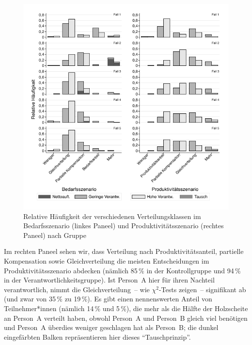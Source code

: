 \documentclass[justified,nobib,nohyper,symmetric,twoside]{tufte-book}
\begin{document}
\begin{figure}[t]\label{fig:abbildung_9}
   \center
   \caption{Relative Häufigkeit der verschiedenen Verteilungsklassen
im Bedarfsszenario (linkes Paneel) und Produktivitätsszenario (rechtes Paneel) nach Gruppe}
   \includegraphics[width=0.99\linewidth]{figure_9.pdf}
\end{figure}

Im rechten Paneel sehen wir, dass Verteilung nach Produktivitätsanteil, partielle Kompensation sowie Gleichverteilung die meisten Entscheidungen im Produktivitätsszenario abdecken (nämlich 85\,\% in der Kontrollgruppe und 94\,\% in der Verantwortlichkeitsgruppe).
Ist Person~A hier für ihren Nachteil verantwortlich, nimmt die Gleichverteilung~-- wie $\chi^{\textrm{2}}$-Tests zeigen~-- signifikant ab (und zwar von 35\,\% zu 19\,\%).
Es gibt einen nennenswerten Anteil von Teilnehmer*innen (nämlich 14\,\% und 5\,\%), die mehr als die Hälfte der Holzscheite an Person~A verteilt haben, obwohl Person~A und Person~B gleich viel benötigen und Person~A überdies weniger geschlagen hat als Person~B; die dunkel eingefärbten Balken repräsentieren hier dieses \enquote{Tauschprinzip}.
\end{document}
